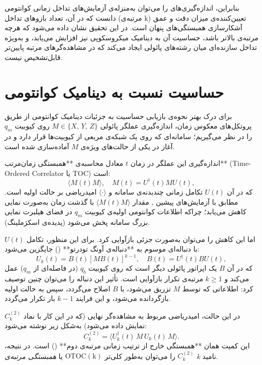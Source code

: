 بنابراین، اندازه‌گیری‌های  را می‌توان به‌منزله‌ی آزمایش‌های تداخل زمانی کوانتومی دانست که در آن، تعداد بازوهای تداخل (مرتبه‌ی k) تعیین‌کننده‌ی میزان دقت و عمق آشکارسازی همبستگی‌های پنهان است. در این تحقیق نشان داده می‌شود که هرچه مرتبه‌ی  بالاتر باشد، حساسیت آن به دینامیک میکروسکوپی نیز افزایش می‌یابد، و به‌ویژه  تداخل سازنده‌ای میان رشته‌های پائولی ایجاد می‌کند که در مشاهده‌گرهای مرتبه‌ پایین‌تر قابل‌تشخیص نیست.


\section{حساسیت  نسبت به دینامیک کوانتومی}
\label{sec:sensitivity}

برای درک بهتر نحوه‌ی بازیابی حساسیت به جزئیات دینامیک کوانتومی از طریق پروتکل‌های معکوس زمان، اندازه‌گیری عملگر پائولی 
\( M \in \{X,\, Y,\, Z\} \) 
روی کیوبیت \( q_m \) را در نظر می‌گیریم؛ سامانه‌ای که روی یک شبکه‌ی مربعی از کیوبیت‌ها قرار دارد و در آغاز در یکی از حالت‌های ویژه‌ی \( M \) آماده‌سازی شده است. 

اندازه‌گیری این عملگر در زمان \( t \) معادل محاسبه‌ی **همبستگی زمان‌مرتب** (Time-Ordered Correlator یا TOC) است:
\[
\langle M(t) M \rangle, \quad M(t) = U^\dagger(t) M U(t),
\]
که در آن \( U(t) \) تکامل زمانی چند‌بدنه‌ی سامانه و \( \langle \cdot \rangle \) امیدریاضی بر حالت اولیه است.  
مطابق با آزمایش‌های پیشین \cite{Kaufman2016, Zhang2023}, مقدار \(\langle M(t) M \rangle\) با گذشت زمان به‌صورت نمایی کاهش می‌یابد؛ چراکه اطلاعات کوانتومی اولیه‌ی کیوبیت \( q_m \) در فضای هیلبرت نمایی بزرگ سامانه پخش می‌شود (پدیده‌ی اسکرَملینگ).

اما این کاهش را می‌توان به‌صورت جزئی بازآوایی کرد. برای این منظور، تکامل \( U(t) \) با دنباله‌ای موسوم به **دنباله‌ی آونگ تودرتو** () جایگزین می‌شود:
\[
U_k(t) = B(t) [M B(t)]^{k-1}, \quad B(t) = U^\dagger(t) B U(t),
\]
که در آن \( B \) یک اپراتور پائولی دیگر است که روی کیوبیت \( q_b \) (در فاصله‌ای از \( q_m \)) عمل می‌کند و \( k \ge 1 \) مرتبه‌ی تکرار بازآوایی است.  
تأثیر این دنباله را می‌توان چنین توصیف کرد: اطلاعاتی که توسط \( M \) تزریق می‌شود، با \( B \) اصلاح می‌گردد، سپس به حالت اولیه بازگردانده می‌شود، و این فرایند \( k-1 \) بار تکرار می‌گردد.

در این حالت، امیدریاضی مربوط به مشاهده‌گر نهایی (که در این کار با نماد \( C^{(2)}_k \) نمایش داده می‌شود) به‌شکل زیر نوشته می‌شود:
\[
C^{(2)}_k = \langle U_k^\dagger(t)\, M\, U_k(t)\, M \rangle.
\tag{1}
\]
این کمیت همان **همبستگی خارج از ترتیب زمانی مرتبه‌ی دوم** () است. در نتیجه، \( C^{(2)}_k \) را می‌توان به‌طور کلی‌تر \(\mathrm{OTOC(k)}\) یا \textit{همبستگی مرتبه‌ی k} نامید.

